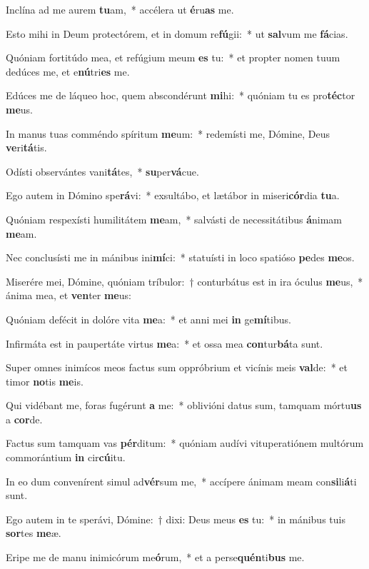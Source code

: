 \item Inclína ad me aurem \textbf{tu}am,~* accélera ut \textbf{é}ru\textbf{as} me.
\item Esto mihi in Deum protectórem, et in domum re\textbf{fú}gii:~* ut \textbf{sal}vum me \textbf{fá}cias.
\item Quóniam fortitúdo mea, et refúgium meum \textbf{es} tu:~* et propter nomen tuum dedúces me, et e\textbf{nú}tri\textbf{es} me.
\item Edúces me de láqueo hoc, quem abscondérunt \textbf{mi}hi:~* quóniam tu es pro\textbf{téc}tor \textbf{me}us.
\item In manus tuas comméndo spíritum \textbf{me}um:~* redemísti me, Dómine, Deus \textbf{ve}ri\textbf{tá}tis.
\item Odísti observántes vani\textbf{tá}tes,~* \textbf{su}per\textbf{vá}cue.
\item Ego autem in Dómino spe\textbf{rá}vi:~* exsultábo, et lætábor in miseri\textbf{cór}dia \textbf{tu}a.
\item Quóniam respexísti humilitátem \textbf{me}am,~* salvásti de necessitátibus \textbf{á}nimam \textbf{me}am.
\item Nec conclusísti me in mánibus ini\textbf{mí}ci:~* statuísti in loco spatióso \textbf{pe}des \textbf{me}os.
\item Miserére mei, Dómine, quóniam tríbulor:~† conturbátus est in ira óculus \textbf{me}us,~* ánima mea, et \textbf{ven}ter \textbf{me}us:
\item Quóniam defécit in dolóre vita \textbf{me}a:~* et anni mei \textbf{in} ge\textbf{mí}tibus.
\item Infirmáta est in paupertáte virtus \textbf{me}a:~* et ossa mea \textbf{con}tur\textbf{bá}ta sunt.
\item Super omnes inimícos meos factus sum oppróbrium et vicínis meis \textbf{val}de:~* et timor \textbf{no}tis \textbf{me}is.
\item Qui vidébant me, foras fugérunt \textbf{a} me:~* oblivióni datus sum, tamquam mórtu\textbf{us} a \textbf{cor}de.
\item Factus sum tamquam vas \textbf{pér}ditum:~* quóniam audívi vituperatiónem multórum commorántium \textbf{in} cir\textbf{cú}itu.
\item In eo dum convenírent simul ad\textbf{vér}sum me,~* accípere ánimam meam con\textbf{si}li\textbf{á}ti sunt.
\item Ego autem in te sperávi, Dómine:~† dixi: Deus meus \textbf{es} tu:~* in mánibus tuis \textbf{sor}tes \textbf{me}æ.
\item Eripe me de manu inimicórum me\textbf{ó}rum,~* et a perse\textbf{quén}ti\textbf{bus} me.
